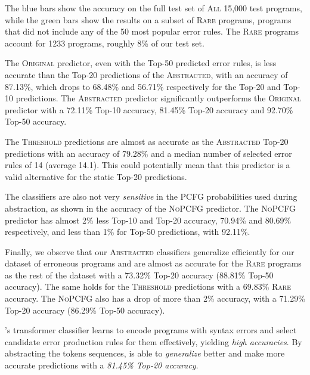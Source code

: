 The blue bars show the accuracy on the full test set of \textsc{All} 15,000 test
programs, while the green bars show the results on a subset of \textsc{Rare}
programs, \ie programs that did not include any of the 50 most popular error
rules. The \textsc{Rare} programs account for 1233 programs, roughly 8\% of our
test set.

The \textsc{Original} predictor, even with the Top-50 predicted error rules, is
less accurate than the Top-20 predictions of the \textsc{Abstracted}, with an
accuracy of 87.13\%, which drops to 68.48\% and 56.71\% respectively for the
Top-20 and Top-10 predictions. The \textsc{Abstracted} predictor significantly
outperforms the \textsc{Original} predictor with a 72.11\% Top-10 accuracy,
81.45\% Top-20 accuracy and 92.70\% Top-50 accuracy.

The \textsc{Threshold} predictions are almost as accurate as the
\textsc{Abstracted} Top-20 predictions with an accuracy of 79.28\% and a median
number of selected error rules of 14 (average 14.1). This could potentially mean
that this predictor is a valid alternative for the static Top-20 predictions.

 The classifiers
are also not very \emph{sensitive} in the PCFG probabilities used during
abstraction, as shown in the accuracy of the \textsc{NoPCFG} predictor. The
\textsc{NoPCFG} predictor has almost 2\% less Top-10 and Top-20 accuracy,
70.94\% and 80.69\% respectively, and less than 1\% for Top-50 predictions, with
92.11\%.

Finally, we observe that our \textsc{Abstracted} classifiers generalize
efficiently for our dataset of erroneous \python programs and are almost as
accurate for the \textsc{Rare} programs as the rest of the dataset with a
73.32\% Top-20 accuracy (88.81\% Top-50 accuracy). The same holds for the
\textsc{Threshold} predictions with a 69.83\% \textsc{Rare} accuracy. The
\textsc{NoPCFG} also has a drop of more than 2\% accuracy, with a 71.29\% Top-20
accuracy (86.29\% Top-50 accuracy).

\begin{framed}
  \noindent \toolname's transformer classifier learns to encode programs with
  syntax errors and select candidate error production rules for them
  effectively, yielding \emph{high accuracies}. By abstracting the tokens
  sequences, \toolname is able to \emph{generalize} better and make more
  accurate predictions with a \emph{81.45\% Top-20 accuracy}.
\end{framed}


